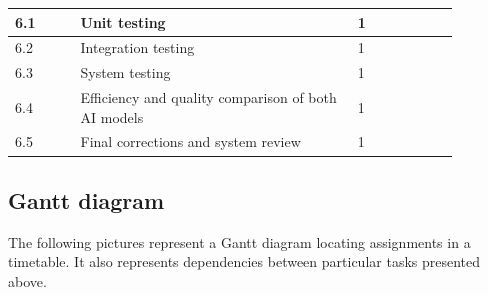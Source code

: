 \documentclass{article}
\begin{document}
\begin{center}
\begin{tabular}{ |p{0.13\linewidth}|p{0.55\linewidth}|p{0.20\linewidth}| }
        \hline
        6.1                                                                     & Unit testing                                         & 1                \\
        \hline
        6.2                                                                     & Integration testing                                  & 1                \\
        \hline
        6.3                                                                     & System testing                                       & 1                \\
        \hline
        6.4                                                                     & Efficiency and quality comparison of both AI models  & 1                \\
        \hline
        6.5                                                                     & Final corrections and system review                  & 1                \\
        \hline
    \end{tabular}
\end{center}

\subsection{Gantt diagram}
The following pictures represent a Gantt diagram locating assignments in a timetable. It also represents dependencies between particular tasks presented above.
\end{document}
